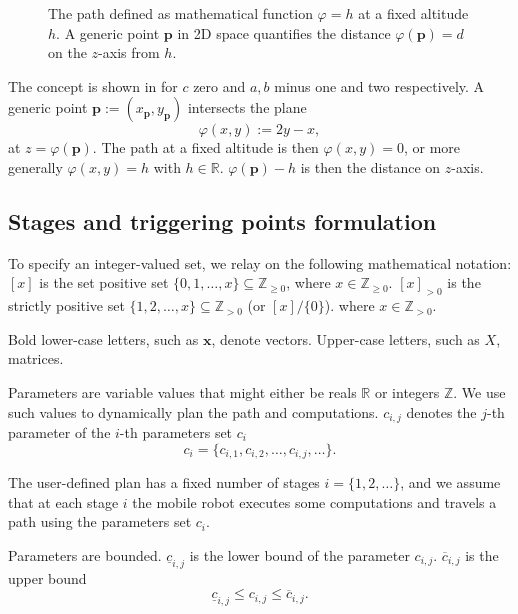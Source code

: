 \begin{figure}[t]
  \centering
  
  \caption[Concept of the path and generic point in space]{The path defined as mathematical function $\varphi=h$ at a fixed altitude $h$. A generic point $\mathbf{p}$ in 2D space quantifies the distance $\varphi(\mathbf{p})=d$ on the $z$-axis from $h$.}
  \label{fig:plot1}
\end{figure}

The concept is shown in  for $c$ zero and $a,b$ minus one and two respectively. A generic point $\mathbf{p}:=(x_{\mathbf{p}},y_{\mathbf{p}})$ intersects the plane
\begin{equation}
  \varphi(x,y):=2y-x,
\end{equation}
at $z=\varphi(\mathbf{p})$. The path at a fixed altitude is then $\varphi(x,y)=0$, or more generally $\varphi(x,y)=h$ with $h\in\mathbb{R}$. $\varphi(\mathbf{p})-h$ is then the distance on $z$-axis.

\subsection{Stages and triggering points formulation}

To specify an integer-valued set, we relay on the following mathematical notation: $[x]$ is the set positive set $\{0,1,\dots,x\}\subseteq\mathbb{Z}_{\geq 0}$, where $x\in\mathbb{Z}_{\geq 0}$. $[x]_{>0}$ is the strictly positive set $\{1,2,\dots,x\}\subseteq\mathbb{Z}_{> 0}$ (or $[x]/\{0\}$). where $x\in\mathbb{Z}_{>0}$. 

Bold lower-case letters, such as $\mathbf{x}$, denote vectors. Upper-case letters, such as $X$, matrices.

Parameters are variable values that might either be reals $\mathbb{R}$ or integers $\mathbb{Z}$. We use such values to dynamically plan the path and computations. $c_{i,j}$ denotes the $j$-th parameter of the $i$-th parameters set $c_i$
\begin{equation}
  c_i=\{c_{i,1},c_{i,2},\dots,c_{i,j},\dots\}.
\end{equation}

The user-defined plan has a fixed number of stages $i=\{1,2,\dots\}$, and we assume that at each stage $i$ the mobile robot executes some computations and travels a path using the parameters set $c_i$.

Parameters are bounded. $\underline{c}_{i,j}$ is the lower bound of the parameter $c_{i,j}$. $\overline{c}_{i,j}$ is the upper bound
\begin{equation}
  \underline{c}_{i,j}\leq c_{i,j}\leq\overline{c}_{i,j}.
\end{equation}

